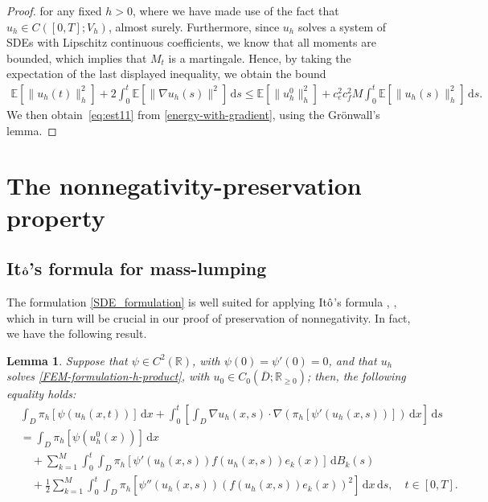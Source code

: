 \documentclass[12pt]{article}
\newtheorem{lemma}{Lemma}[section]
\newcommand{\E}{\mathbb{E}}
\newcommand{\dd}{\,\mathrm{d}}
\begin{document}
{\begin{proof}
    for any fixed $h>0$, where we have made use of the fact that $u_h \in C([0,T]; V_h)$, almost surely. Furthermore, since $u_h$ solves a system of SDEs with Lipschitz continuous coefficients, we know that all moments are bounded, which implies that $M_t$ is a martingale.
    Hence, by taking the expectation of the last displayed inequality, we obtain the bound
    \begin{align}\label{energy-with-gradient}
         \E [\| u_h(t) \|_h^2 ]  + 2 \int_0^t \E[\|\nabla u_h(s) \|^2] \dd s\leq 
         \E[\| u_h^0 \|_h^2] + c_e^2 c_f^2 M \int_0^t \E[\| u_h(s) \|_h^2] \dd s.
    \end{align}
    We then obtain~\eqref{eq:est11} from \eqref{energy-with-gradient}, using the Gr\" onwall's lemma.
\end{proof}

\section{The nonnegativity-preservation property}\label{Section:nonnegativity}


\subsection{It$\hat{\bf o}$'s formula for mass-lumping}

The formulation \eqref{SDE_formulation} is well suited for applying It$\hat{\rm{o}}$'s formula \cite[Theorem 1.2]{pardouxt1980stochastic}, \cite[Theorem 2.1]{donati1993white}, which in turn will be crucial in our proof of preservation of nonnegativity. In fact, we have the following result.

\begin{lemma}
\label{lemma:new-ito}
    Suppose that    
     $\psi \in C^{2}(\mathbb{R})$, with $\psi(0)=\psi'(0)=0$,
     and that $u_h$ solves \eqref{FEM-formulation-h-product}, with $u_0 \in C_0(\overline{D};\mathbb{R}_{\geq 0})$; then, the following equality holds:
\begin{align}\label{eq:new-ito}
&\int_D \pi_h[\psi(u_h(x,t))] \dd x + \int_0^t \left[\int_D \nabla u_h(x,s) \cdot \nabla \left(\pi_h[\psi'(u_h(x,s))]\right) \dd x \right]\! \dd s\nonumber \\
&
= \int_D \pi_h[\psi(u_h^0(x))] \dd x\nonumber \\
&\quad +\sum_{k=1}^M \int_0^t \int_D \pi_h [\psi'(u_h(x,s))f(u_h(x,s))e_k(x)] \dd B_k(s)\nonumber \\
&\quad + 
\frac{1}{2}\sum_{k=1}^M \int_0^t \int_D \pi_h[\psi''(u_h(x,s))(f(u_h(x,s))e_k(x))^2]\dd x \dd s,\quad t \in [0,T].
\end{align}
\end{lemma}


}
\end{document}
